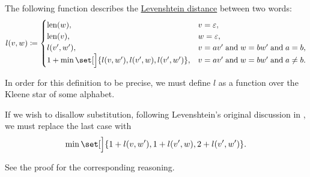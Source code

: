 \begin{proposition}\label{thm:levenshtein_distance_characterization}
  The following function describes the \hyperref[def:levenshtein_distance]{Levenshtein distance} between two words:
  \begin{equation}\label{eq:thm:levenshtein_distance_characterization}
    l(v, w) \coloneqq \begin{cases}
      \len(w),                                             &v = \varepsilon, \\
      \len(v),                                             &w = \varepsilon, \\
      l(v', w'),                                           &v = av' \T{and} w = bw' \T{and} a = b, \\
      1 + \min\set[\Big]{ l(v, w'), l(v', w), l(v', w') }, &v = av' \T{and} w = bw' \T{and} a \neq b.
    \end{cases}
  \end{equation}
\end{proposition}
\begin{comments}
  \item In order for this definition to be precise, we must define \( l \) as a function over the Kleene star of some alphabet.
  \item If we wish to disallow substitution, following Levenshtein's original discussion in \cite[2]{Левенштейн1965}, we must replace the last case with
  \begin{equation*}
    \min\set[\Big]{ 1 + l(v, w'), 1 + l(v', w), 2 + l(v', w') }.
  \end{equation*}

  See the proof for the corresponding reasoning.
\end{comments}
